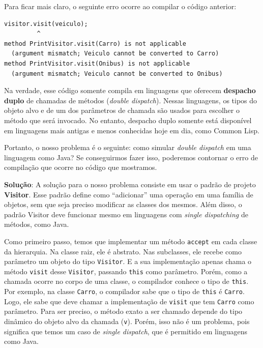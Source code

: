 \documentclass[
  11pt,
  twoside]{book}
\newcommand{\passthrough}[1]{#1}
\begin{document}
Para ficar mais claro, o seguinte erro ocorre ao compilar o código
anterior:

\begin{lstlisting}
visitor.visit(veiculo);  
         ^
method PrintVisitor.visit(Carro) is not applicable
  (argument mismatch; Veiculo cannot be converted to Carro)
method PrintVisitor.visit(Onibus) is not applicable
  (argument mismatch; Veiculo cannot be converted to Onibus)
\end{lstlisting}

   Na
verdade, esse código somente compila em linguagens que oferecem
\textbf{despacho duplo} de chamadas de métodos (\emph{double dispatch}).
Nessas linguagens, os tipos do objeto alvo e de um dos parâmetros de
chamada são usados para escolher o método que será invocado. No entanto,
despacho duplo somente está disponível em linguagens mais antigas e
menos conhecidas hoje em dia, como Common Lisp.

Portanto, o nosso problema é o seguinte: como simular \emph{double
dispatch} em uma linguagem como Java? Se conseguirmos fazer isso,
poderemos contornar o erro de compilação que ocorre no código que
mostramos.

\textbf{Solução}: A solução para o nosso problema consiste em usar o
padrão de projeto \textbf{Visitor}. Esse padrão define como
``adicionar'' uma operação em uma família de objetos, sem que seja
preciso modificar as classes dos mesmos. Além disso, o padrão Visitor
deve funcionar mesmo em linguagens com \emph{single dispatching} de
métodos, como Java.

 Como primeiro passo, temos que implementar um
método \passthrough{\lstinline!accept!} em cada classe da hierarquia. Na
classe raiz, ele é abstrato. Nas subclasses, ele recebe como parâmetro
um objeto do tipo \passthrough{\lstinline!Visitor!}. E a sua
implementação apenas chama o método \passthrough{\lstinline!visit!}
desse \passthrough{\lstinline!Visitor!}, passando
\passthrough{\lstinline!this!} como parâmetro. Porém, como a chamada
ocorre no corpo de uma classe, o compilador conhece o tipo de
\passthrough{\lstinline!this!}. Por exemplo, na classe
\passthrough{\lstinline!Carro!}, o compilador sabe que o tipo de
\passthrough{\lstinline!this!} é \passthrough{\lstinline!Carro!}. Logo,
ele sabe que deve chamar a implementação de
\passthrough{\lstinline!visit!} que tem \passthrough{\lstinline!Carro!}
como parâmetro. Para ser preciso, o método exato a ser chamado depende
do tipo dinâmico do objeto alvo da chamada
(\passthrough{\lstinline!v!}). Porém, isso não é um problema, pois
significa que temos um caso de \emph{single dispatch}, que é permitido
em linguagens como Java.
\end{document}
